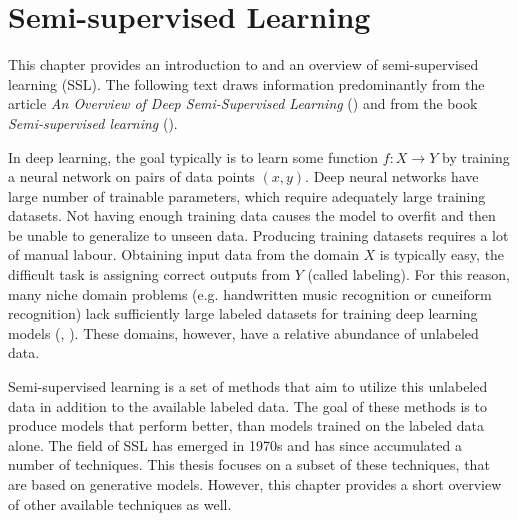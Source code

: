 \chapter{Semi-supervised Learning}
\label{chap:SemisupervisedLearning}

This chapter provides an introduction to and an overview of semi-supervised learning (SSL). The following text draws information predominantly from the article \emph{An Overview of Deep Semi-Supervised Learning} (\cite{SemisupervisedOverview}) and from the book \emph{Semi-supervised learning} (\cite{SslBook}).

In deep learning, the goal typically is to learn some function $f: X \rightarrow Y$ by training a neural network on pairs of data points $(x, y)$. Deep neural networks have large number of trainable parameters, which require adequately large training datasets. Not having enough training data causes the model to overfit and then be unable to generalize to unseen data. Producing training datasets requires a lot of manual labour. Obtaining input data from the domain $X$ is typically easy, the difficult task is assigning correct outputs from $Y$ (called labeling). For this reason, many niche domain problems (e.g. handwritten music recognition or cuneiform recognition) lack sufficiently large labeled datasets for training deep learning models (\cite{MuscimaPP}, \cite{Cuneiforms}). These domains, however, have a relative abundance of unlabeled data.

Semi-supervised learning is a set of methods that aim to utilize this unlabeled data in addition to the available labeled data. The goal of these methods is to produce models that perform better, than models trained on the labeled data alone. The field of SSL has emerged in 1970s and has since accumulated a number of techniques. This thesis focuses on a subset of these techniques, that are based on generative models. However, this chapter provides a short overview of other available techniques as well.

